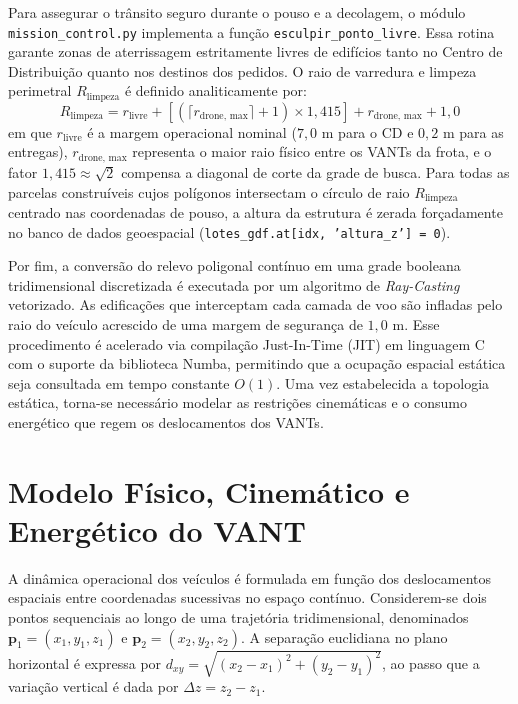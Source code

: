 Para assegurar o trânsito seguro durante o pouso e a decolagem, o módulo \texttt{mission\_control.py} implementa a função \texttt{esculpir\_ponto\_livre}. Essa rotina garante zonas de aterrissagem estritamente livres de edifícios tanto no Centro de Distribuição quanto nos destinos dos pedidos. O raio de varredura e limpeza perimetral $R_{\text{limpeza}}$ é definido analiticamente por:
\begin{equation}\label{eq:raio_limpeza}
R_{\text{limpeza}} = r_{\text{livre}} + \left[ \left(\lceil r_{\text{drone, max}} \rceil + 1\right) \times 1{,}415 \right] + r_{\text{drone, max}} + 1{,}0
\end{equation}
em que $r_{\text{livre}}$ é a margem operacional nominal ($7{,}0\text{ m}$ para o CD e $0{,}2\text{ m}$ para as entregas), $r_{\text{drone, max}}$ representa o maior raio físico entre os VANTs da frota, e o fator $1{,}415 \approx \sqrt{2}$ compensa a diagonal de corte da grade de busca. Para todas as parcelas construíveis cujos polígonos intersectam o círculo de raio $R_{\text{limpeza}}$ centrado nas coordenadas de pouso, a altura da estrutura é zerada forçadamente no banco de dados geoespacial (\texttt{lotes\_gdf.at[idx, 'altura\_z'] = 0}).

Por fim, a conversão do relevo poligonal contínuo em uma grade booleana tridimensional discretizada é executada por um algoritmo de \textit{Ray-Casting} vetorizado. As edificações que interceptam cada camada de voo são infladas pelo raio do veículo acrescido de uma margem de segurança de $1{,}0\text{ m}$. Esse procedimento é acelerado via compilação Just-In-Time (JIT) em linguagem C com o suporte da biblioteca Numba, permitindo que a ocupação espacial estática seja consultada em tempo constante $O(1)$. Uma vez estabelecida a topologia estática, torna-se necessário modelar as restrições cinemáticas e o consumo energético que regem os deslocamentos dos VANTs.

\section{Modelo Físico, Cinemático e Energético do VANT}\label{sec:modelo_fisico}

A dinâmica operacional dos veículos é formulada em função dos deslocamentos espaciais entre coordenadas sucessivas no espaço contínuo. Considerem-se dois pontos sequenciais ao longo de uma trajetória tridimensional, denominados $\mathbf{p}_1 = (x_1, y_1, z_1)$ e $\mathbf{p}_2 = (x_2, y_2, z_2)$. A separação euclidiana no plano horizontal é expressa por $d_{xy} = \sqrt{(x_2 - x_1)^2 + (y_2 - y_1)^2}$, ao passo que a variação vertical é dada por $\Delta z = z_2 - z_1$.

